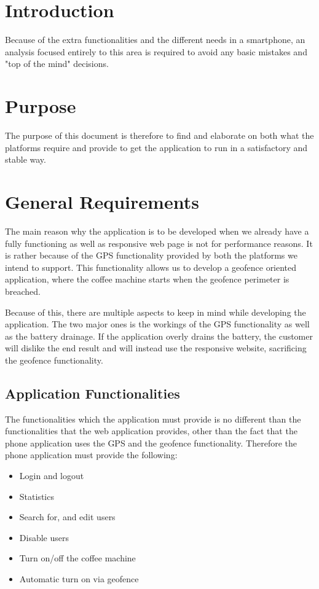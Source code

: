 \section{Introduction}

Because of the extra functionalities and the different needs in a smartphone, an analysis focused entirely to this area is required to avoid any basic mistakes and "top of the mind" decisions.

\section{Purpose}

The purpose of this document is therefore to find and elaborate on both what the platforms require and provide to get the application to run in a satisfactory and stable way.

\section{General Requirements}

The main reason why the application is to be developed when we already have a fully functioning as well as responsive web page is not for performance reasons. It is rather because of the GPS functionality provided by both the platforms we intend to support. This functionality allows us to develop a geofence oriented application, where the coffee machine starts when the geofence perimeter is breached.

Because of this, there are multiple aspects to keep in mind while developing the application. The two major ones is the workings of the GPS functionality as well as the battery drainage. If the application overly drains the battery, the customer will dislike the end result and will instead use the responsive website, sacrificing the geofence functionality.

\subsection{Application Functionalities}

The functionalities which the application must provide is no different than the functionalities that the web application provides, other than the fact that the phone application uses the GPS and the geofence functionality. Therefore the phone application must provide the following:

\begin{itemize}
\item Login and logout
\item Statistics
\item Search for, and edit users
\item Disable users
\item Turn on/off the coffee machine
\item Automatic turn on via geofence
\end{itemize}

